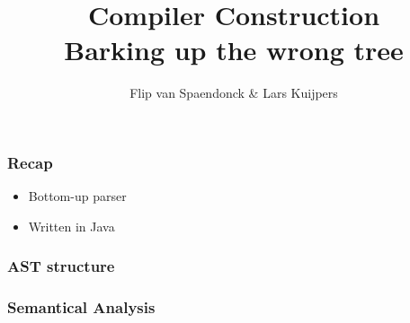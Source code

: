 \documentclass{beamer}
\author[Flip \& Lars]{Flip van Spaendonck \& Lars Kuijpers}
\title{Compiler Construction \\ Barking up the wrong tree}
\begin{document}
\begin{frame}
\titlepage
\end{frame}

\begin{frame}
\frametitle{Recap}
\begin{itemize}
\item Bottom-up parser
\item Written in Java
\end{itemize}
\end{frame}

\begin{frame}
\frametitle{AST structure}
\end{frame}

\begin{frame}
\frametitle{Semantical Analysis}
\end{frame}

\begin{frame}
\end{frame}
\end{document}
